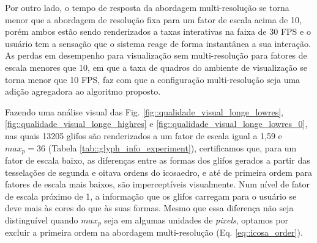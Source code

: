 Por outro lado, o tempo de resposta da abordagem multi-resolução se torna menor que a abordagem de resolução fixa para um fator de escala acima de 10, porém ambos estão sendo renderizados a taxas interativas na faixa de 30 FPS \cite{nielsen1994} e o usuário tem a sensação que o sistema reage de forma instantânea a sua interação. As perdas em desempenho para visualização sem multi-resolução para fatores de escala menores que 10, em que a taxa de quadros do ambiente de visualização se torna menor que 10 FPS, faz com que a configuração multi-resolução seja uma adição agregadora ao algoritmo proposto.%

Fazendo uma análise visual das Fig. \ref{fig::qualidade_visual_longe_lowres},  \ref{fig::qualidade_visual_longe_highres} e \ref{fig::qualidade_visual_longe_lowres_0}, nas quais 13205 glifos são renderizados a um fator de escala igual a 1,59 e $max_p = 36$ (Tabela \ref{tab::glyph_info_experiment}), certificamos que, para um fator de escala baixo, as diferenças entre as formas dos glifos gerados a partir das tesselações de segunda e oitava ordens do icosaedro, e até de primeira ordem para fatores de escala mais baixos, são imperceptíveis visualmente. Num nível de fator de escala próximo de 1, a informação que os glifos carregam para o usuário se deve mais às cores do que às suas formas. Mesmo que essa diferença não seja distinguível quando $max_p$ seja em algumas unidades de \textit{pixels}, optamos por excluir a primeira ordem na abordagem multi-resolução (Eq. \ref{eq::icosa_order}).


